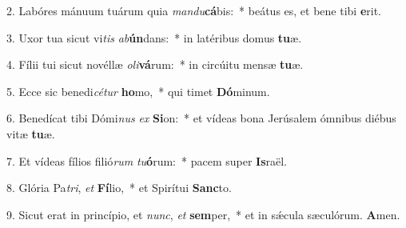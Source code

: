 2. Labóres mánuum tuárum quia \textit{man}\textit{du}\textbf{cá}bis:~*  beátus es, et bene tibi \textbf{e}rit.\

3. Uxor tua sicut vi\textit{tis} \textit{ab}\textbf{ún}dans:~*  in latéribus domus \textbf{tu}æ.\

4. Fílii tui sicut novéllæ \textit{o}\textit{li}\textbf{vá}rum:~*  in circúitu mensæ \textbf{tu}æ.\

5. Ecce sic benedi\textit{cé}\textit{tur} \textbf{ho}mo,~*  qui timet \textbf{Dó}minum.\

6. Benedícat tibi Dómi\textit{nus} \textit{ex} \textbf{Si}on:~*  et vídeas bona Jerúsalem ómnibus diébus vitæ \textbf{tu}æ.\

7. Et vídeas fílios filió\textit{rum} \textit{tu}\textbf{ó}rum:~*  pacem super \textbf{Is}raël.\

8. Glória Pa\textit{tri}, \textit{et} \textbf{Fí}lio,~*  et Spirítui \textbf{Sanc}to.\

9. Sicut erat in princípio, et \textit{nunc}, \textit{et} \textbf{sem}per,~*  et in sǽcula sæculórum. \textbf{A}men.\

